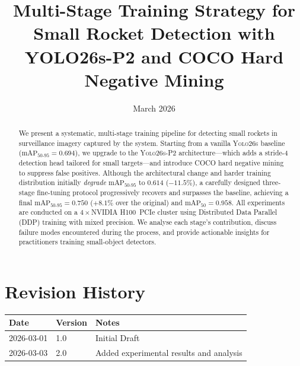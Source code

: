 \documentclass[12pt, titlepage]{article}
\begin{document}
\title{Multi-Stage Training Strategy for Small Rocket Detection with YOLO26s-P2 and COCO Hard Negative Mining}
\author{\authname}
\date{March 2026}

\maketitle

\begin{abstract}
  We present a systematic, multi-stage training pipeline for detecting
  small rockets in surveillance imagery captured by the \progname{} system.
  Starting from a vanilla \textsc{Yolo26s}{} baseline
  ($\text{mAP}_{50\text{-}95} = 0.694$), we upgrade to the \textsc{Yolo26s-P2}{} architecture---which
  adds a stride-4 detection head tailored for small targets---and
  introduce COCO hard negative mining to suppress false positives.
  Although the architectural change and harder training distribution
  initially \emph{degrade} $\text{mAP}_{50\text{-}95}$ to $0.614$ ($-11.5\%$), a
  carefully designed three-stage fine-tuning protocol progressively
  recovers and surpasses the baseline, achieving a final
  $\text{mAP}_{50\text{-}95} = 0.750$ ($+8.1\%$ over the original) and
  $\text{mAP}_{50} = 0.958$.  All experiments are conducted on a
  $4{\times}$NVIDIA H100~PCIe cluster using Distributed Data Parallel
  (DDP) training with mixed precision.  We analyse each stage's
  contribution, discuss failure modes encountered during the process,
  and provide actionable insights for practitioners training small-object
  detectors.
\end{abstract}


\section*{Revision History}

\begin{tabularx}{\textwidth}{p{3cm}p{2cm}X}
  \toprule {\bf Date} & {\bf Version} & {\bf Notes}                             \\
  \midrule
  2026-03-01          & 1.0           & Initial Draft                           \\
  2026-03-03          & 2.0           & Added experimental results and analysis \\
  \bottomrule
\end{tabularx}

~\\
\end{document}

